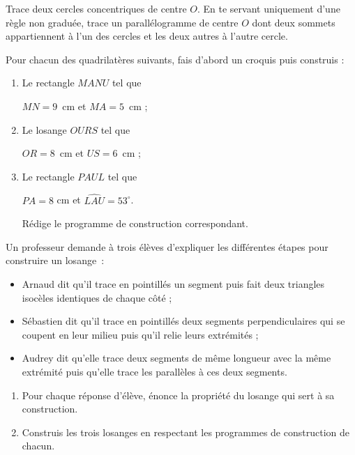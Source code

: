 \begin{exercice}
Trace deux cercles concentriques de centre $O$. En te servant uniquement d'une règle non graduée, trace un parallélogramme de centre $O$ dont deux sommets appartiennent à l'un des cercles et les deux autres à l'autre cercle.
\end{exercice}


\begin{exercice}
Pour chacun des quadrilatères suivants, fais d’abord un croquis puis construis :
\begin{enumerate}
 \item Le rectangle $MANU$ tel que 
 
 $MN = 9$ cm et $MA = 5$ cm ;
 \item Le losange $OURS$ tel que 
 
 $OR = 8$ cm et $US = 6$ cm ;
 \item Le rectangle $PAUL$ tel que 
 
 $PA = 8$ cm et $\widehat{LAU} = 53^\circ$. 
 
 Rédige le programme de construction correspondant.
 \end{enumerate}
\end{exercice}


\begin{exercice}
Un professeur demande à trois élèves d'expliquer les différentes étapes pour construire un losange : 
\begin{itemize}
 \item Arnaud dit qu'il trace en pointillés un segment puis fait deux triangles isocèles identiques de chaque côté ;
 \item Sébastien dit qu'il trace en pointillés deux segments perpendiculaires qui se coupent en leur milieu puis qu'il relie leurs extrémités ;
 \item Audrey dit qu'elle trace deux segments de même longueur avec la même extrémité puis qu'elle trace les parallèles à ces deux segments.
 \end{itemize}
 \begin{enumerate}
  \item Pour chaque réponse d'élève, énonce la propriété du losange qui sert à sa construction.
  \item Construis les trois losanges en respectant les programmes de construction de chacun.
 \end{enumerate}
\end{exercice}
